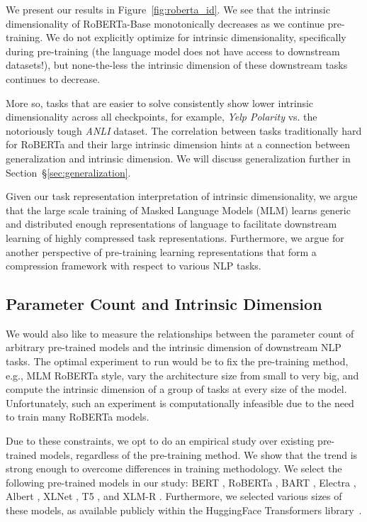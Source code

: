 We present our results in Figure~\ref{fig:roberta_id}. We see that the intrinsic dimensionality of RoBERTa-Base monotonically decreases as we continue pre-training. We do not explicitly optimize for intrinsic dimensionality, specifically during pre-training (the language model does not have access to downstream datasets!), but none-the-less the intrinsic dimension of these downstream tasks continues to decrease.

More so, tasks that are easier to solve consistently show lower intrinsic dimensionality across all checkpoints, for example, \textit{Yelp Polarity} vs. the notoriously tough \textit{ANLI} dataset. The correlation between tasks traditionally hard for RoBERTa and their large intrinsic dimension hints at a connection between generalization and intrinsic dimension. We will discuss generalization further in Section~\S\ref{sec:generalization}.

Given our task representation interpretation of intrinsic dimensionality, we argue that the large scale training of Masked Language Models (MLM) learns generic and distributed enough representations of language to facilitate downstream learning of highly compressed task representations. Furthermore, we argue for another perspective of pre-training learning representations that form a compression framework with respect to various NLP tasks.

\subsection{Parameter Count and Intrinsic Dimension}
\label{section:parameter_exploration}

We would also like to measure the relationships between the parameter count of arbitrary pre-trained models and the intrinsic dimension of downstream NLP tasks. The optimal experiment to run would be to fix the pre-training method, e.g., MLM RoBERTa style, vary the architecture size from small to very big, and compute the intrinsic dimension of a group of tasks at every size of the model. Unfortunately, such an experiment is computationally infeasible due to the need to train many RoBERTa models.

Due to these constraints, we opt to do an empirical study over existing pre-trained models, regardless of the pre-training method. We show that the trend is strong enough to overcome differences in training methodology. We select the following pre-trained models in our study: BERT \citep{BERT}, RoBERTa \citep{ROBERTA}, BART \citep{BART}, Electra \citep{ELECTRA}, Albert \citep{ALBERT}, XLNet \citep{XLNET}, T5 \citep{T5}, and XLM-R \citep{XLMR}. Furthermore, we selected various sizes of these models, as available publicly within the HuggingFace Transformers library~\citep{huggingface}.

